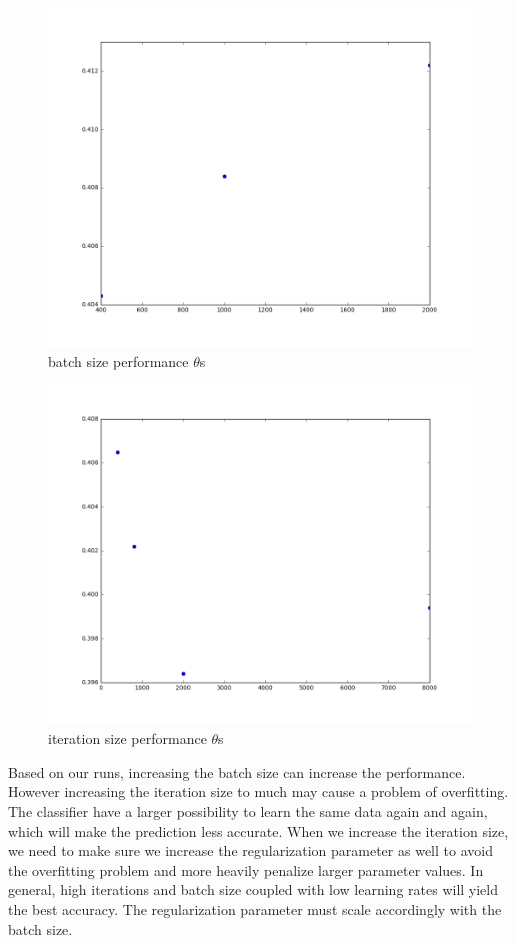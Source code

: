 \documentclass[pdftex,11pt]{article}
\begin{document}
\begin{figure}[H]
  \caption{batch size performance $\theta$s}
  \centering
    \includegraphics[scale=0.5]{classiferbatch.png}
\end{figure}
\begin{figure}[H]
  \caption{iteration size performance $\theta$s}
  \centering
    \includegraphics[scale=0.5]{classiferitere.png}
\end{figure}
Based on our runs, increasing the batch size can increase the performance. However increasing the iteration size to much may cause a problem of overfitting. The classifier have a larger possibility to learn the same data again and again, which will make the prediction less accurate. When we increase the iteration size, we need to make sure we increase the regularization parameter as well to avoid the overfitting problem and more heavily penalize larger parameter values. 
In general, high iterations and batch size coupled with low learning rates will yield the best accuracy. The regularization parameter must scale accordingly with the batch size. 
\end{document}
